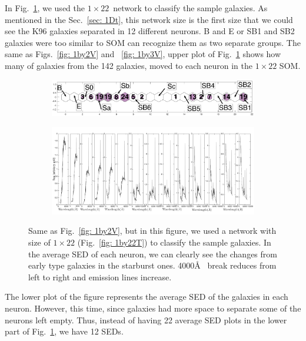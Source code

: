 \documentclass[useAMS,usenatbib]{mn2e}
\begin{document}
            In Fig.~\ref{fig: 1by22V}, we used the $1\times22$~network to classify the sample galaxies.
            As mentioned in the Sec.~\ref{sec: 1Dt}, this network size is the first size that we could see the K96 galaxies separated in 12 different neurons.
            B and E or SB1 and SB2 galaxies were too similar to SOM can recognize them as two separate groups.
            The same as Figs.~\ref{fig: 1by2V} and ~\ref{fig: 1by3V}, upper plot of Fig.~\ref{fig: 1by22V} shows how many of galaxies from the 142 galaxies, moved to each neuron in the $1\times22$ SOM.
            \begin{figure}
                \begin{subfigure}[b]{0.9\textwidth}
                    \centering
                    \includegraphics[width=\textwidth]{images0.01/1d/hit_v_1_by_22_n.png}
                \end{subfigure}
                \hfill
                \begin{subfigure}[b]{0.9\textwidth}
                     \includegraphics[width=\textwidth]{images0.01/1d/SED_total1by22.png}
                \end{subfigure}
                \caption{Same as Fig.~\ref{fig: 1by2V}, but in this figure, we used a network with size of $1\times22$ (Fig.~\ref{fig: 1by22T}) to classify the sample galaxies. In the average SED of each neuron, we can clearly see the changes from early type galaxies in the starburst ones. 4000\AA~ break reduces from left to right and emission lines increase.}
                \label{fig: 1by22V}
            \end{figure}
            The lower plot of the figure represents the average SED of the galaxies in each neuron.
            However, this time, since galaxies had more space to separate some of the neurons left empty. 
            Thus, instead of having 22 average SED plots in the lower part of Fig.~\ref{fig: 1by22V}, we have 12 SEDs.
            
\end{document}
